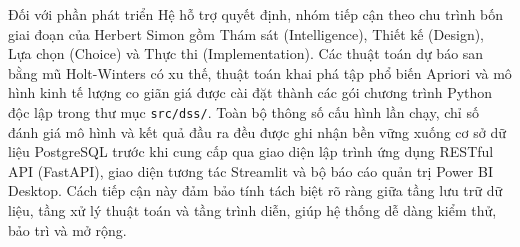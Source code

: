 Đối với phần phát triển Hệ hỗ trợ quyết định, nhóm tiếp cận theo chu trình bốn giai đoạn của Herbert Simon gồm Thám sát (Intelligence), Thiết kế (Design), Lựa chọn (Choice) và Thực thi (Implementation). Các thuật toán dự báo san bằng mũ Holt-Winters có xu thế, thuật toán khai phá tập phổ biến Apriori và mô hình kinh tế lượng co giãn giá được cài đặt thành các gói chương trình Python độc lập trong thư mục \texttt{src/dss/}. Toàn bộ thông số cấu hình lần chạy, chỉ số đánh giá mô hình và kết quả đầu ra đều được ghi nhận bền vững xuống cơ sở dữ liệu PostgreSQL trước khi cung cấp qua giao diện lập trình ứng dụng RESTful API (FastAPI), giao diện tương tác Streamlit và bộ báo cáo quản trị Power BI Desktop. Cách tiếp cận này đảm bảo tính tách biệt rõ ràng giữa tầng lưu trữ dữ liệu, tầng xử lý thuật toán và tầng trình diễn, giúp hệ thống dễ dàng kiểm thử, bảo trì và mở rộng.
